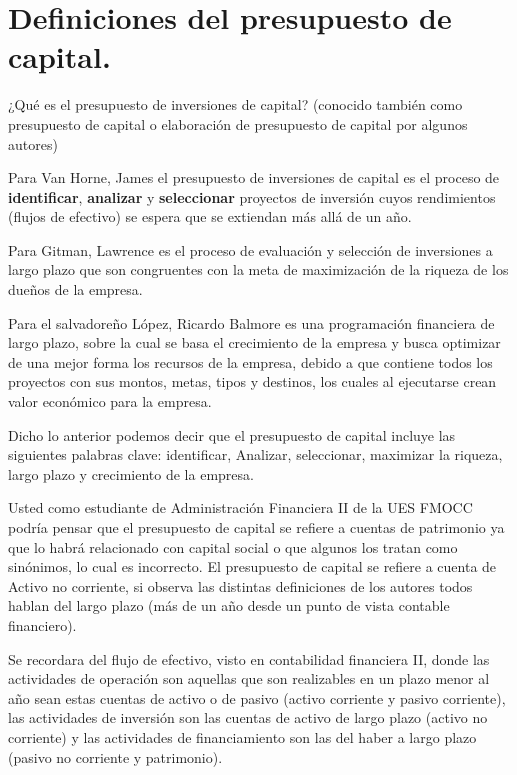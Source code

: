 \documentclass[12pt, a4paper]{article}
\begin{document}
\newpage

\section{Definiciones del presupuesto de capital.}

¿Qué es el presupuesto de inversiones de capital? (conocido también como presupuesto de capital o elaboración de presupuesto de capital por algunos autores)

Para Van Horne, James el presupuesto de inversiones de capital es el proceso de \textbf{identificar}, \textbf{analizar} y \textbf{seleccionar} proyectos de inversión cuyos rendimientos (flujos de efectivo) se espera que se extiendan más allá de un año.

Para Gitman, Lawrence es el proceso de evaluación y selección de inversiones a largo plazo que son congruentes con la meta de maximización de la riqueza de los dueños de la empresa.

Para el salvadoreño López, Ricardo Balmore es una programación financiera de largo plazo, sobre la cual se basa el crecimiento de la empresa y busca optimizar de una mejor forma los recursos de la empresa, debido a que contiene todos los proyectos con sus montos, metas, tipos y destinos, los cuales al ejecutarse crean valor económico para la empresa.

Dicho lo anterior podemos decir que el presupuesto de capital incluye las siguientes palabras clave: identificar, Analizar, seleccionar, maximizar la riqueza, largo plazo y crecimiento de la empresa.

Usted como estudiante de Administración Financiera II de la UES FMOCC podría pensar que el presupuesto de capital se refiere a cuentas de patrimonio ya que lo habrá relacionado con capital social o que algunos los tratan como sinónimos, lo cual es incorrecto. El presupuesto de capital se refiere a cuenta de Activo no corriente, si observa las distintas definiciones de los autores todos hablan del largo plazo (más de un año desde un punto de vista contable financiero).

Se recordara del flujo de efectivo, visto en contabilidad financiera II, donde las actividades de operación son aquellas que son realizables en un plazo menor al año sean estas cuentas de activo o de pasivo (activo corriente y pasivo corriente), las actividades de inversión son las cuentas de activo de largo plazo (activo no corriente) y las actividades de financiamiento son las del haber a largo plazo (pasivo no corriente y patrimonio).
\end{document}
